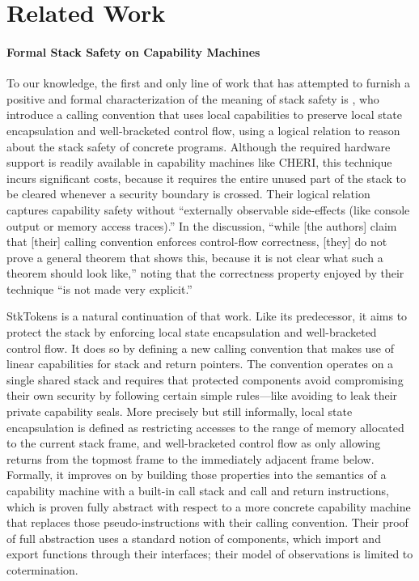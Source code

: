 \documentclass[acmsmall,review,anonymous]{acmart}\settopmatter{printfolios=true,printccs=false,printacmref=false}
\begin{document}
{\section{Related Work}
\label{sec:relwork}


\paragraph{Formal Stack Safety on Capability Machines}
%
To our knowledge, the first and only line of work that has attempted
to furnish a positive and formal characterization of the meaning of
stack safety is \citet{Skorstengaard+19b}, who introduce a calling
convention that uses local capabilities to preserve local state
encapsulation and well-bracketed control flow, using a logical
relation to reason about the stack safety of concrete
programs. Although the required hardware support is readily available
in capability machines like CHERI, this technique incurs significant
costs, because it requires the entire unused part of the stack to be
cleared whenever a security boundary is crossed. Their logical
relation captures capability safety without ``externally observable
side-effects (like console output or memory access traces).'' In the
discussion, ``while [the authors] claim that [their] calling
convention enforces control-flow correctness, [they] do not prove a
general theorem that shows this, because it is not clear what such a
theorem should look like,'' noting that the correctness property
enjoyed by their technique ``is not made very explicit.''

StkTokens \citep{Skorstengaard+19} is a natural continuation of that work. Like
its predecessor, it aims to protect the stack by enforcing local state
encapsulation and well-bracketed control flow. It does so by defining a new
calling convention that makes use of linear capabilities for stack and return
pointers. The convention operates on a single shared stack and requires that
protected components avoid compromising their own security by following certain
simple rules---like avoiding to leak their private capability seals. More
precisely but still informally, local state encapsulation is defined as
restricting accesses to the range of memory allocated to the current stack
frame, and well-bracketed control flow as only allowing returns from the topmost
frame to the immediately adjacent frame below. Formally, it improves on
\citet{Skorstengaard+19b} by building those properties into the semantics of a
capability machine with a built-in call stack and call and return instructions,
which is proven fully abstract with respect to a more concrete capability
machine that replaces those pseudo-instructions with their calling convention.
Their proof of full abstraction uses a standard notion of components, which
import and export functions through their interfaces; their model of
observations is limited to cotermination.

}
\end{document}

